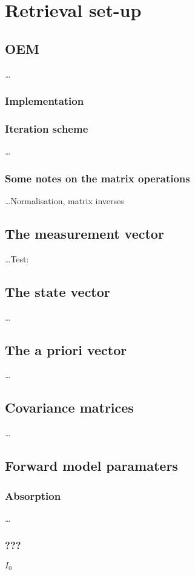 \chapter{Retrieval set-up}
\label{chapter:retrieval}

\section{OEM}
\label{sec:oem}
%
\dots

\subsection{Implementation}
\label{sec:oem.m}
%


\subsection{Iteration scheme}
\label{sec:ml}
%
\dots


\subsection{Some notes on the matrix operations}
\label{sec:matrixops}
%
\dots Normalisation, matrix inverses




\section{The measurement vector}
\label{sec:y}
%
\dots Test: \MsrVct


\section{The state vector}
\label{sec:x}
%
\dots


\section{The a priori vector}
\label{sec:x}
%
\dots


\section{Covariance matrices}
\label{sec:x}
%
\dots



\section{Forward model paramaters}
\label{sec:b}


\subsection{Absorption}
\label{sec:b:abs}
%
\dots






\subsection{???}
\label{sec:b:???}
%
$I_0$




